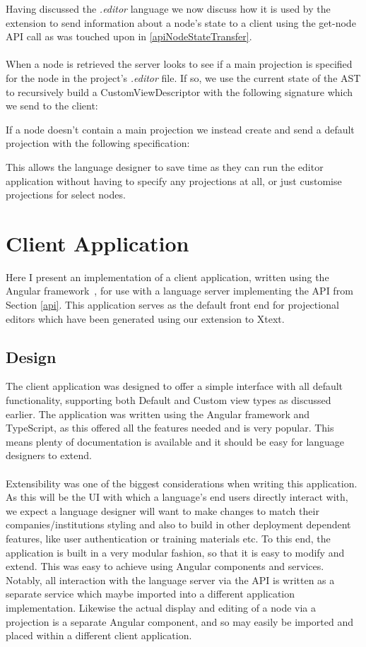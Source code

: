 \documentclass{article}
\begin{document}
{Having discussed the \emph{.editor} language we now discuss how it is used by the extension to send information about a node's state to a client using the get-node API call as was touched upon in \ref{apiNodeStateTransfer}. 
\\
\\
When a node is retrieved the server looks to see if a main projection is specified for the node in the project's \emph{.editor} file. If so, we use the current state of the AST to recursively build a CustomViewDescriptor with the following signature which we send to the client:

If a node doesn't contain a main projection we instead create and send a default projection with the following specification: 

This allows the language designer to save time as they can run the editor application without having to specify any projections at all, or just customise projections for select nodes. 


\section{Client Application}\label{clientApp}
Here I present an implementation of a client application, written using the Angular framework~\cite{angular}, for use with a language server implementing the API from Section \ref{api}. This application serves as the default front end for projectional editors which have been generated using our extension to Xtext. 

\subsection{Design}
The client application was designed to offer a simple interface with all default functionality, supporting both Default and Custom view types as discussed earlier. The application was written using the Angular framework and TypeScript, as this offered all the features needed and is very popular. This means plenty of documentation is available and it should be easy for language designers to extend.
\\
\\
Extensibility was one of the biggest considerations when writing this application. As this will be the UI with which a language's end users directly interact with, we expect a language designer will want to make changes to match their companies/institutions styling and also to build in other  deployment dependent features, like user authentication or training materials etc. To this end, the application is built in a very modular fashion, so that it is easy to modify and extend. This was easy to achieve using Angular components and services. Notably, all interaction with the language server via the API is written as a separate service which maybe imported into a different application implementation. Likewise the actual display and editing of a node via a projection is a separate Angular component, and so may easily be imported and placed within a different client application.
}
\end{document}
